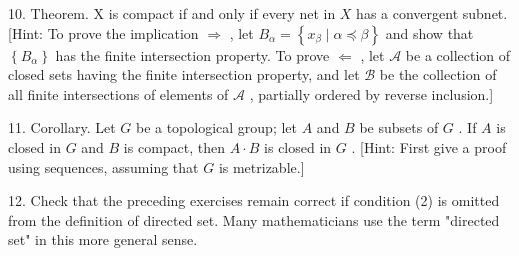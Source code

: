 10. Theorem. X is compact if and only if every net in \(X\) has a convergent subnet. [Hint: To prove the implication \(\Rightarrow\) , let \({B}_{\alpha } = \left\{  {{x}_{\beta } \mid  \alpha  \preccurlyeq  \beta }\right\}\) and show that \(\left\{  {B}_{\alpha }\right\}\) has the finite intersection property. To prove \(\Leftarrow\) , let \(\mathcal{A}\) be a collection of closed sets having the finite intersection property, and let \(\mathcal{B}\) be the collection of all finite intersections of elements of \(\mathcal{A}\) , partially ordered by reverse inclusion.]

11. Corollary. Let \(G\) be a topological group; let \(A\) and \(B\) be subsets of \(G\) . If \(A\) is closed in \(G\) and \(B\) is compact, then \(A \cdot  B\) is closed in \(G\) . [Hint: First give a proof using sequences, assuming that \(G\) is metrizable.]

12. Check that the preceding exercises remain correct if condition (2) is omitted from the definition of directed set. Many mathematicians use the term "directed set" in this more general sense.